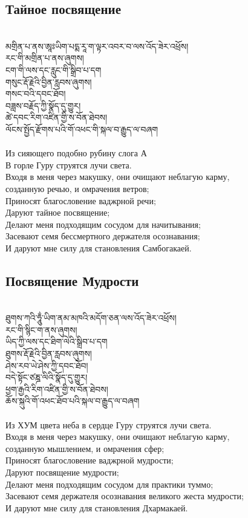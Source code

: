 \subsection{Тайное посвящение}
\\
\ti
མགྲིན་པ་ནས་ཨཱཿཡིག་པདྨ་རཱ་ག་ལྟར་འབར་བ་ལས་འོད་ཟེར་འཕྲོས།\\
རང་གི་མགྲིན་པ་ནས་ཞུགས།\\
ངག་གི་ལས་དང་རླུང་གི་སྒྲིབ་པ་དག\\
གསུང་རྡོ་རྗེའི་བྱིན་རླབས་ཞུགས།\\
གསང་བའི་དབང་ཐོབ།\\
བཟླས་བརྗོད་ཀྱི་སྣོད་དུ་གྱུར།\\
ཚེ་དབང་རིག་འཛིན་གྱི་ས་བོན་ཐེབས།\\
ལོངས་སྤྱོད་རྫོགས་པའི་གོ་འཕང་གི་སྐལ་བ་རྒྱུད་ལ་བཞག\\
\\
\ru
Из сияющего подобно рубину слога А\\
В горле Гуру струятся лучи света. \\
Входя в меня через макушку, они очищают неблагую карму,\\
созданную речью, и омрачения ветров;\\
Приносят благословение ваджрной речи;\\
Даруют тайное посвящение;\\
Делают меня подходящим сосудом для начитывания;\\
Засевают семя бессмертного держателя осознавания;\\
И даруют мне силу для становления Самбогакаей.

\newpage
\subsection{Посвящение Мудрости}
\\
\ti
ཐུགས་ཀའི་ཧཱུྂ་ཡིག་ནམ་མཁའི་མདོག་ཅན་ལས་འོད་ཟེར་འཕྲོས།\\
རང་གི་སྙིང་ག་ནས་ཞུགས།\\
ཡིད་ཀྱི་ལས་དང་ཐིག་ལེའི་སྒྲིབ་པ་དག\\
ཐུགས་རྡོ་རྗེའི་བྱིན་རླབས་ཞུགས།\\
ཤེས་རབ་ཡེ་ཤེས་ཀྱི་དབང་ཐོབ།\\
བདེ་སྟོང་ཙཎྜ་ལིའི་སྣོད་དུ་གྱུར།\\
ཕྱག་རྒྱའི་རིག་འཛིན་གྱི་ས་བོན་ཐེབས།\\
ཆོས་སྐུའི་གོ་འཕང་ཐོབ་པའི་སྐལ་བ་རྒྱུད་ལ་བཞག\\
\\
\ru
Из ХУМ цвета неба в сердце Гуру струятся лучи света.\\
Входя в меня через макушку, они очищают неблагую карму,\\
созданную мышлением, и омрачения сфер;\\
Приносят благословение ваджрной мудрости;\\
Даруют посвящение мудрости;\\
Делают меня подходящим сосудом для практики туммо;\\
Засевают семя держателя осознавания великого жеста мудрости;\\
И даруют мне силу для становления Дхармакаей.

